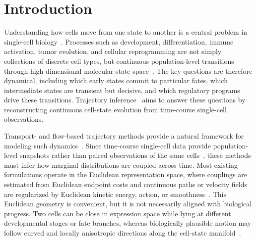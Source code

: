 \section{Introduction}
\label{sec:intro}

Understanding how cells move from one state to another is a central problem in single-cell biology~\citep{farrell2018single,wagner2018single,schiebinger2019optimal,tanay2017scaling,griffiths2018using}. Processes such as development, differentiation, immune activation, tumor evolution, and cellular reprogramming are not simply collections of discrete cell types, but continuous population-level transitions through high-dimensional molecular state space~\citep{trapnell2014dynamics,haghverdi2016diffusion,setty2019characterization,cacchiarelli2018aligning}. The key questions are therefore dynamical, including which early states commit to particular fates, which intermediate states are transient but decisive, and which regulatory programs drive these transitions. Trajectory inference~\citep{lavenant2021towards,hashimoto2016learning} aims to answer these questions by reconstructing continuous cell-state evolution from time-course single-cell observations.

Transport- and flow-based trajectory methods provide a natural framework for modeling such dynamics~\citep{schiebinger2019optimal, peyre2019computational,lavenant2021towards}. Since time-course single-cell data provide population-level snapshots rather than paired observations of the same cells~\citep{schiebinger2019optimal, weinreb2018fundamental}, these methods must infer how marginal distributions are coupled across time. Most existing formulations operate in the Euclidean representation space, where couplings are estimated from Euclidean endpoint costs and continuous paths or velocity fields are regularized by Euclidean kinetic energy, action, or smoothness~\citep{neklyudov2023action,tong2023conditional,tong2020trajectorynet,huguet2022manifold}. This Euclidean geometry is convenient, but it is not necessarily aligned with biological progress. Two cells can be close in expression space while lying at different developmental stages or fate branches, whereas biologically plausible motion may follow curved and locally anisotropic directions along the cell-state manifold~\citep{moon2019visualizing,wolf2019paga}.

